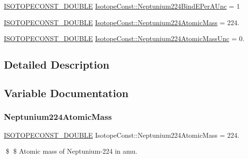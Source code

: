 \begin{DoxyCompactItemize}
\mbox{\hyperlink{group___isotope_const-_macros_ga8f45a7272ce02c0b4c65c44636ed719a}{I\+S\+O\+T\+O\+P\+E\+C\+O\+N\+S\+T\+\_\+\+D\+O\+U\+B\+LE}} \mbox{\hyperlink{group___isotope_const-_neptunium-_np224_ga1fb16b3e4758ac57657b79f48603dc78}{Isotope\+Const\+::\+Neptunium224\+Bind\+E\+Per\+A\+Unc}} = 1
\item 
\mbox{\hyperlink{group___isotope_const-_macros_ga8f45a7272ce02c0b4c65c44636ed719a}{I\+S\+O\+T\+O\+P\+E\+C\+O\+N\+S\+T\+\_\+\+D\+O\+U\+B\+LE}} \mbox{\hyperlink{group___isotope_const-_neptunium-_np224_gad1cab2f99d4fa8f113b8e6a6813f7ef9}{Isotope\+Const\+::\+Neptunium224\+Atomic\+Mass}} = 224.
\item 
\mbox{\hyperlink{group___isotope_const-_macros_ga8f45a7272ce02c0b4c65c44636ed719a}{I\+S\+O\+T\+O\+P\+E\+C\+O\+N\+S\+T\+\_\+\+D\+O\+U\+B\+LE}} \mbox{\hyperlink{group___isotope_const-_neptunium-_np224_ga196d0d83dd541a9c592be8b07286bec0}{Isotope\+Const\+::\+Neptunium224\+Atomic\+Mass\+Unc}} = 0.
\end{DoxyCompactItemize}


\subsection{Detailed Description}


\subsection{Variable Documentation}
\mbox{\label{group___isotope_const-_neptunium-_np224_gad1cab2f99d4fa8f113b8e6a6813f7ef9}} 
\subsubsection{\texorpdfstring{Neptunium224\+Atomic\+Mass}{Neptunium224AtomicMass}}
{\footnotesize\ttfamily \mbox{\hyperlink{group___isotope_const-_macros_ga8f45a7272ce02c0b4c65c44636ed719a}{I\+S\+O\+T\+O\+P\+E\+C\+O\+N\+S\+T\+\_\+\+D\+O\+U\+B\+LE}} Isotope\+Const\+::\+Neptunium224\+Atomic\+Mass = 224.}

\$ \$ Atomic mass of Neptunium-\/224 in amu. \mbox{\label{group___isotope_const-_neptunium-_np224_ga196d0d83dd541a9c592be8b07286bec0}} 
